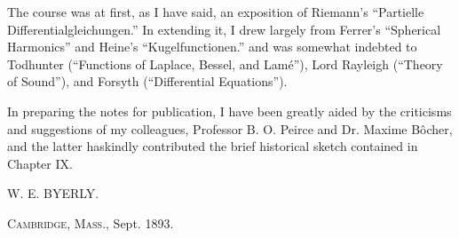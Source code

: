 \documentclass[oneside,12pt]{book}
\begin{document}
The course was at first, as I have said, an exposition of Riemann's ``Partielle Differentialgleichungen.'' In extending it, I drew largely from Ferrer's ``Spherical Harmonics'' and Heine's ``Kugelfunctionen.'' and was somewhat indebted to Todhunter (``Functions of Laplace, Bessel, and Lam\'e''), Lord Rayleigh (``Theory of Sound''), and Forsyth (``Differential Equations''). \par 

In preparing the notes for publication, I have been greatly aided by the criticisms and suggestions of my colleagues, Professor B. O. Peirce and Dr. Maxime B\^ocher, and the latter haskindly contributed the brief historical sketch contained in Chapter IX. \par 

\begin{flushright}
    W. E. BYERLY.
\end{flushright}
\textsc{Cambridge, Mass.,} Sept. 1893.
\end{document}
